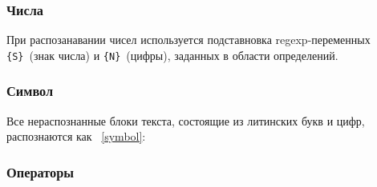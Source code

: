 \subsubsection{Числа}\label{lexnumbers}


При распозанавании чисел используется подставновка regexp-переменных
\verb|{S}|\ (знак числа) и \verb|{N}|\ (цифры), заданных в области определений. 

\subsubsection{Символ}\label{lexsymbol}

Все нераспознанные блоки текста, состоящие из литинских букв и цифр,
распознаются как \ \ref{symbol}:


\subsubsection{Операторы}\label{lexops}

